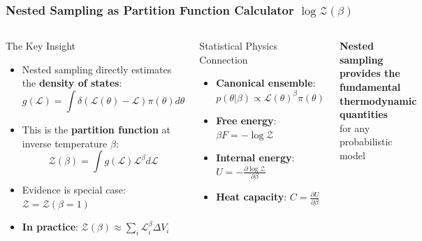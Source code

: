 \documentclass[aspectratio=169]{beamer}
\begin{document}
\begin{frame}
    \frametitle{Nested Sampling as Partition Function Calculator $\log \mathcal{Z}(\beta)$}
    \begin{columns}
        \begin{block}{The Key Insight}
            \begin{itemize}
                \item Nested sampling directly estimates the \textbf{density of states}:
                    \[ g(\mathcal{L}) = \int \delta(\mathcal{L}(\theta) - \mathcal{L}) \pi(\theta) d\theta \]
                \item This is the \textbf{partition function} at inverse temperature $\beta$:
                    \[ \mathcal{Z}(\beta) = \int g(\mathcal{L}) \mathcal{L}^{\beta} d\mathcal{L} \]
                \item Evidence is special case: $\mathcal{Z} = \mathcal{Z}(\beta=1)$
                \item \textbf{In practice}: $\mathcal{Z}(\beta) \approx \sum_i \mathcal{L}_i^\beta \Delta V_i$
            \end{itemize}
        \end{block}
        \begin{block}{Statistical Physics Connection}
            \begin{itemize}
                \item \textbf{Canonical ensemble}: $p(\theta|\beta) \propto \mathcal{L}(\theta)^\beta \pi(\theta)$
                \item \textbf{Free energy}: $\beta F = -\log \mathcal{Z}$
                \item \textbf{Internal energy}: $U = -\frac{\partial \log \mathcal{Z}}{\partial \beta}$
                \item \textbf{Heat capacity}: $C = \frac{\partial U}{\partial \beta}$
            \end{itemize}
        \end{block}
        \vspace{10pt}
        \begin{center}
            \textbf{Nested sampling provides the fundamental thermodynamic quantities}\\
            for any probabilistic model
        \end{center}
    \end{columns}
\end{frame}
\end{document}
